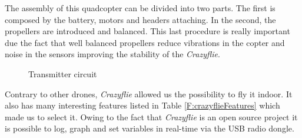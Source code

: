 The assembly of this quadcopter can be divided into two parts. The first is composed by the battery, motors and headers attaching. In the second, the propellers are introduced and balanced. This last procedure is really important due the fact that well balanced propellers reduce vibrations in the copter and noise in the sensors improving the stability of the \textit{Crazyflie}.


\begin{figure}[H]
\centering
\begin{subfigmatrix}{2}
\vspace{1em} 
\hspace*{\fill}%
\hfill 
{}
\hspace*{\fill}%
\end{subfigmatrix}
\caption{Transmitter circuit}
\end{figure}

Contrary to other drones, \textit{Crazyflie} allowed us the possibility to fly it indoor. It also has many interesting features listed in Table \ref{F:crazyflieFeatures} which made us to select it. Owing to the fact that \textit{Crazyflie} is an open source project it is possible to log, graph and set variables in real-time via the USB radio dongle.

